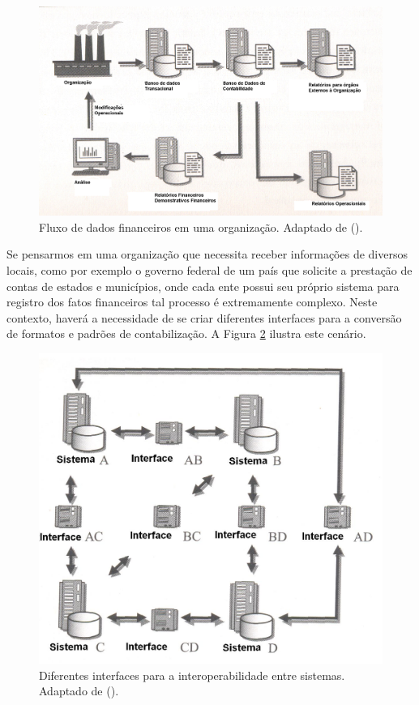 \documentclass[msc,proposal,hidelot,hideabstract]{ppgccufmg} %
\begin{document}
\begin{figure}[hbtp]
\centering
\includegraphics[width=.75\textwidth]{../img/fluxo_informacoes.png}
\caption{Fluxo de dados financeiros em uma organização. Adaptado de (\cite{bergeron2004essentials}).}
\label{fig:fluxo_dados}
\end{figure}

Se pensarmos em uma organização que necessita receber informações de diversos
locais, como por exemplo o governo federal de um país que solicite a prestação
de contas de estados e municípios,
onde cada ente possui seu próprio sistema para registro dos fatos financeiros
tal processo é extremamente complexo.
Neste contexto, haverá a necessidade de se criar diferentes interfaces para a
conversão de formatos e padrões de contabilização.
A Figura \ref{fig:interfaces} ilustra este cenário.

\begin{figure}[hbtp]
\centering
\includegraphics[width=.75\textwidth]{../img/interfaces.png}
\caption{Diferentes interfaces para a interoperabilidade entre sistemas. Adaptado de (\cite{bergeron2004essentials}).}
\label{fig:interfaces}
\end{figure}
\end{document}
